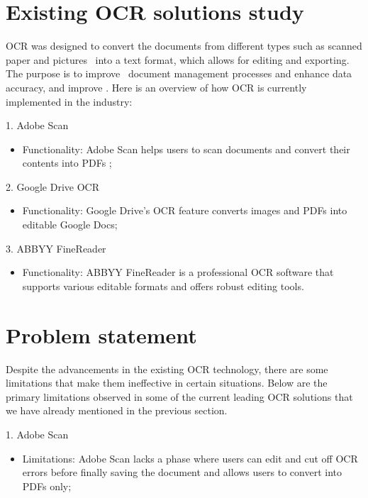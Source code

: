 \section{Existing OCR solutions study}
OCR was designed to convert the documents from different types such as scanned paper and pictures  into a text format, which allows for editing and exporting. The purpose is to improve  document management processes and enhance data accuracy, and improve . Here is an overview of how OCR is currently implemented in the industry: 

1. Adobe Scan

\begin{itemize}
    \item Functionality: Adobe Scan helps users to scan documents and convert their contents into PDFs ;

\end{itemize}

2. Google Drive OCR

\begin{itemize}
    \item Functionality: Google Drive’s OCR feature converts images and PDFs into editable Google Docs;  

\end{itemize}

 3. ABBYY FineReader

\begin{itemize}
    \item Functionality: ABBYY FineReader is a professional OCR software that supports various editable formats and offers robust editing tools.

\end{itemize}
 

\section {Problem statement }
Despite the advancements in the existing OCR technology, there are some limitations that make them ineffective in certain situations. Below are the primary limitations observed in some of the current leading OCR solutions that we have already mentioned in the previous section.

1. Adobe Scan
\begin{itemize}
    \item Limitations: Adobe Scan lacks a phase where users can edit and cut off OCR errors before finally saving the document and allows users to convert into PDFs only;
\end{itemize}        

